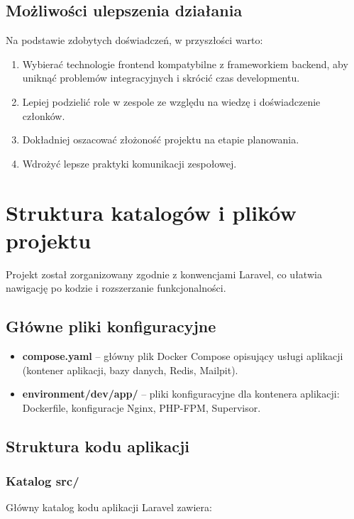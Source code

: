 \documentclass[12pt,a4paper]{article}
\begin{document}
\subsection{Możliwości ulepszenia działania}

Na podstawie zdobytych doświadczeń, w przyszłości warto:
\begin{enumerate}[itemsep=3pt]
    \item Wybierać technologie frontend kompatybilne z frameworkiem backend, aby uniknąć problemów integracyjnych i skrócić czas developmentu.
    \item Lepiej podzielić role w zespole ze względu na wiedzę i doświadczenie członków.
    \item Dokładniej oszacować złożoność projektu na etapie planowania.
    \item Wdrożyć lepsze praktyki komunikacji zespołowej.
\end{enumerate}

\section{Struktura katalogów i plików projektu}

Projekt został zorganizowany zgodnie z konwencjami Laravel, co ułatwia nawigację po kodzie i rozszerzanie funkcjonalności.

\subsection{Główne pliki konfiguracyjne}

\begin{itemize}[itemsep=2pt]
    \item \textbf{compose.yaml} -- główny plik Docker Compose opisujący usługi aplikacji (kontener aplikacji, bazy danych, Redis, Mailpit).
    \item \textbf{environment/dev/app/} -- pliki konfiguracyjne dla kontenera aplikacji: Dockerfile, konfiguracje Nginx, PHP-FPM, Supervisor.
\end{itemize}

\subsection{Struktura kodu aplikacji}

\subsubsection{Katalog src/}
Główny katalog kodu aplikacji Laravel zawiera:
\end{document}
